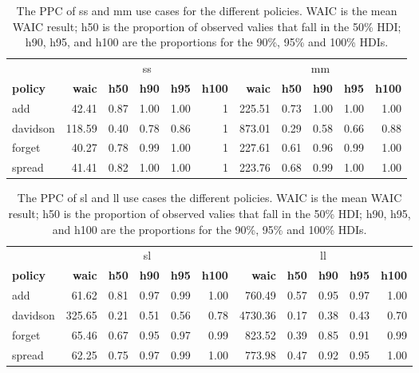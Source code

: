 \documentclass[twoside,11pt,preprint]{article}
\begin{document}
\begin{table}

\caption{\label{tab:tiesxz1}\label{tab:tiesppc1}The PPC of ss and mm use cases for the different policies. WAIC is the mean WAIC result; h50 is the proportion of observed valies that fall in the 50\% HDI; h90, h95, and h100 are the proportions for the 90\%, 95\% and 100\% HDIs.}
\centering
\begin{tabular}[t]{lrrrrrrrrrr}
\toprule
\multicolumn{1}{c}{ } & \multicolumn{5}{c}{ss} & \multicolumn{5}{c}{mm} \\
\cmidrule(l{3pt}r{3pt}){2-6} \cmidrule(l{3pt}r{3pt}){7-11}
\textbf{\textbf{policy}} & \textbf{\textbf{waic}} & \textbf{\textbf{h50}} & \textbf{\textbf{h90}} & \textbf{\textbf{h95}} & \textbf{\textbf{h100}} & \textbf{\textbf{waic}} & \textbf{\textbf{h50}} & \textbf{\textbf{h90}} & \textbf{\textbf{h95}} & \textbf{\textbf{h100}}\\
\midrule
add & 42.41 & 0.87 & 1.00 & 1.00 & 1 & 225.51 & 0.73 & 1.00 & 1.00 & 1.00\\
davidson & 118.59 & 0.40 & 0.78 & 0.86 & 1 & 873.01 & 0.29 & 0.58 & 0.66 & 0.88\\
forget & 40.27 & 0.78 & 0.99 & 1.00 & 1 & 227.61 & 0.61 & 0.96 & 0.99 & 1.00\\
spread & 41.41 & 0.82 & 1.00 & 1.00 & 1 & 223.76 & 0.68 & 0.99 & 1.00 & 1.00\\
\bottomrule
\end{tabular}
\end{table}

\begin{table}

\caption{\label{tab:tiesxz2}\label{tab:tiesppc1b}The PPC of sl and ll use cases the different policies. WAIC is the mean WAIC result; h50 is the proportion of observed valies that fall in the 50\% HDI; h90, h95, and h100 are the proportions for the 90\%, 95\% and 100\% HDIs.}
\centering
\begin{tabular}[t]{lrrrrrrrrrr}
\toprule
\multicolumn{1}{c}{ } & \multicolumn{5}{c}{sl} & \multicolumn{5}{c}{ll} \\
\cmidrule(l{3pt}r{3pt}){2-6} \cmidrule(l{3pt}r{3pt}){7-11}
\textbf{\textbf{policy}} & \textbf{\textbf{waic}} & \textbf{\textbf{h50}} & \textbf{\textbf{h90}} & \textbf{\textbf{h95}} & \textbf{\textbf{h100}} & \textbf{\textbf{waic}} & \textbf{\textbf{h50}} & \textbf{\textbf{h90}} & \textbf{\textbf{h95}} & \textbf{\textbf{h100}}\\
\midrule
add & 61.62 & 0.81 & 0.97 & 0.99 & 1.00 & 760.49 & 0.57 & 0.95 & 0.97 & 1.00\\
davidson & 325.65 & 0.21 & 0.51 & 0.56 & 0.78 & 4730.36 & 0.17 & 0.38 & 0.43 & 0.70\\
forget & 65.46 & 0.67 & 0.95 & 0.97 & 0.99 & 823.52 & 0.39 & 0.85 & 0.91 & 0.99\\
spread & 62.25 & 0.75 & 0.97 & 0.99 & 1.00 & 773.98 & 0.47 & 0.92 & 0.95 & 1.00\\
\bottomrule
\end{tabular}
\end{table}
\end{document}
